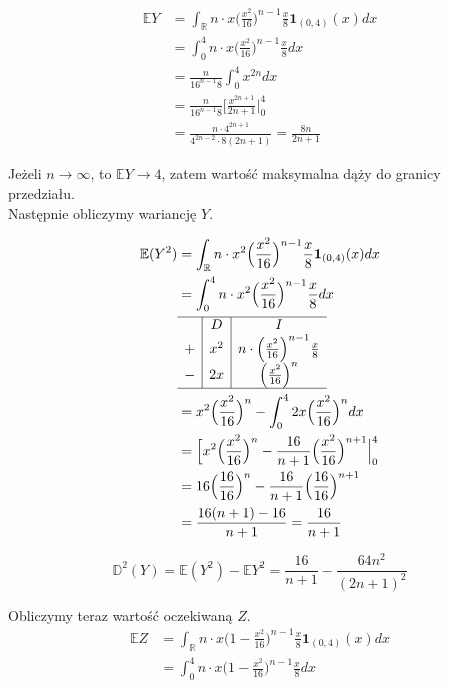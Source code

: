 \documentclass{article}
\begin{document}
\begin{align*}
\mathbb{E}Y & = \int_{\mathbb{R}}^{} n\cdot x \Big( \frac{x^2}{16} \Big)^{n-1} \frac{x}{8} \textbf{1}_{(0,4)}(x) dx \\
& = \int_{0}^{4} n\cdot x \Big( \frac{x^2}{16} \Big)^{n-1} \frac{x}{8} dx \\
& = \frac{n}{16^{n-1}8} \int_{0}^{4} x^{2n} dx \\
& =  \frac{n}{16^{n-1}8} \Big[ \frac{x^{2n+1}}{2n+1} \Big\vert_0^4 \\
& = \frac{n \cdot 4^{2n+1}}{4^{2n-2} \cdot 8(2n+1)} = \frac{8n}{2n+1}
\end{align*}

Jeżeli $n \rightarrow \infty$, to $ \mathbb{E}Y \rightarrow 4$, zatem wartość maksymalna dąży do granicy przedziału.\\
Następnie obliczymy wariancję $Y$.

\begin{align*}
\mathbb{E}(Y^2) & = \int_{\mathbb{R}}^{} n\cdot x^2 \Big( \frac{x^2}{16} \Big)^{n-1} \frac{x}{8} \textbf{1}_{(0,4)}(x) dx \\
& = \int_{0}^{4} n\cdot x^2 \Big( \frac{x^2}{16} \Big)^{n-1} \frac{x}{8} dx \\
&\begin{array}{c|c|c}
\hline
& D & I \\
+ & x^2 & n\cdot \Big( \frac{x^2}{16} \Big)^{n-1} \frac{x}{8} \\
- & 2x & \Big( \frac{x^2}{16} \Big)^n \\
\hline
\end{array} \\
& = x^2 \Big( \frac{x^2}{16} \Big)^n - \int_{0}^{4} 2x \Big( \frac{x^2}{16} \Big)^n dx \\
& = \Big[ x^2 \Big( \frac{x^2}{16} \Big)^n - \frac{16}{n+1} \Big( \frac{x^2}{16} \Big)^{n+1} \Big\vert_0^4 \\
& = 16 \Big( \frac{16}{16} \Big)^n - \frac{16}{n+1} \Big( \frac{16}{16} \Big)^{n+1} \\
& = \frac{16(n+1) - 16}{n+1} = \frac{16}{n+1}
\end{align*}

\[
\mathbb{D}^2(Y) = \mathbb{E}(Y^2) - \mathbb{E}Y^2 = \frac{16}{n+1} - \frac{64n^2}{(2n+1)^2}
\]

Obliczymy teraz wartość oczekiwaną $Z$.
\begin{align*}
\mathbb{E}Z & = \int_{\mathbb{R}}^{} n\cdot x \Big(1 - \frac{x^2}{16} \Big)^{n-1} \frac{x}{8} \textbf{1}_{(0,4)}(x) dx \\
& = \int_{0}^{4} n\cdot x \Big(1 - \frac{x^2}{16} \Big)^{n-1} \frac{x}{8} dx 
\end{align*}
\end{document}
